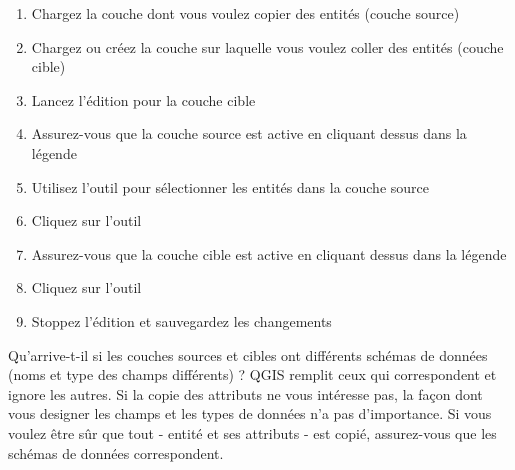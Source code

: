 \begin{itemize}
\begin{enumerate}
\item Chargez la couche dont vous voulez copier des entités (couche source)
\item Chargez ou créez la couche sur laquelle vous voulez coller des entités (couche cible)
\item Lancez l'édition pour la couche cible
\item Assurez-vous que la couche source est active en cliquant dessus dans la légende
\item Utilisez l'outil  pour sélectionner les entités dans la couche source
\item Cliquez sur l'outil 
\item Assurez-vous que la couche cible est active en cliquant dessus dans la légende
\item Cliquez sur l'outil 
\item Stoppez l'édition et sauvegardez les changements
\end{enumerate}

Qu'arrive-t-il si les couches sources et cibles ont différents schémas de données (noms et type des champs différents) ? QGIS remplit ceux qui correspondent et ignore les autres. Si la copie des attributs ne vous intéresse pas, la façon dont vous designer les champs et les types de données n'a pas d'importance. Si vous voulez être sûr que tout - entité et ses attributs - est copié, assurez-vous que les schémas de données correspondent.


\end{itemize}
